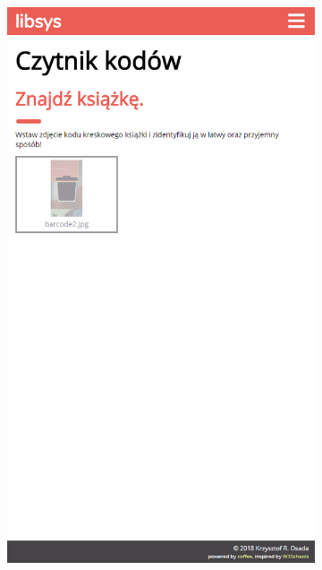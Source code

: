 \documentclass[12pt, a4paper]{article}
\begin{document}
\begin{figure}[h]
\centering
\begin{subfigure}{.48\textwidth}
    \centering
    \includegraphics[width=.75\linewidth]{img/libsys_catalog_3.png}
\end{subfigure}\quad
\begin{subfigure}{.48\textwidth}
    \centering

\end{subfigure}
\end{figure}
\end{document}
